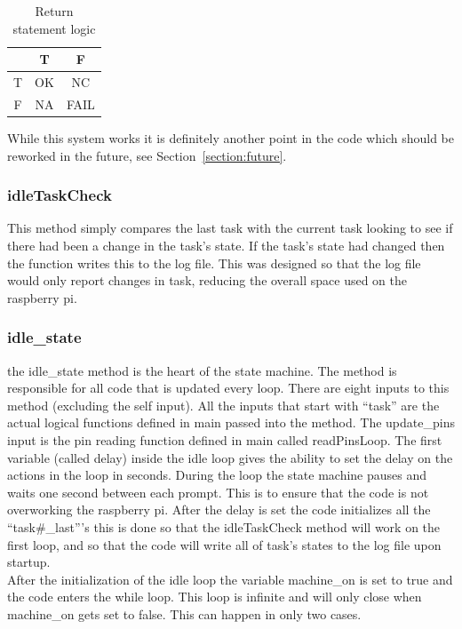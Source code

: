 \documentclass{article}
\begin{document}
\begin{table}[h!]
\centering
    \begin{tabular}{c|c|c}
      & T  & F    \\ \hline
    T & OK & NC   \\ \hline
    F & NA & FAIL 
    \end{tabular}
\caption{Return statement logic}
\label{table:returnl}
\end{table} 


While this system works it is definitely another point in the code which should be reworked in the future, see Section~\ref{section:future}.
\subsubsection{idleTaskCheck}
This method simply compares the last task with the current task looking to see if there had been a change in the task's state. If the task's state had changed then the function writes this to the log file. This was designed so that the log file would only report changes in task, reducing the overall space used on the raspberry pi.

\subsubsection{idle\_state}
the idle\_state method is the heart of the state machine. The method is responsible for all code that is updated every loop. There are eight inputs to this method (excluding the self input). All the inputs that start with ``task'' are the actual logical functions defined in main passed into the method. The update\_pins input is the pin reading function defined in main called readPinsLoop. The first variable (called delay) inside the idle loop gives the ability to set the delay on the actions in the loop in seconds. During the loop the state machine pauses and waits one second between each prompt. This is to ensure that the code is not overworking the raspberry pi. After the delay is set the code initializes all the ``task\#\_last'''s this is done so that the idleTaskCheck method will work on the first loop, and so that the code will write all of task's states to the log file upon startup.\\
After the initialization of the idle loop the variable machine\_on is set to true and the code enters the while loop. This loop is infinite and will only close when machine\_on gets set to false. This can happen in only two cases. \\
\end{document}

